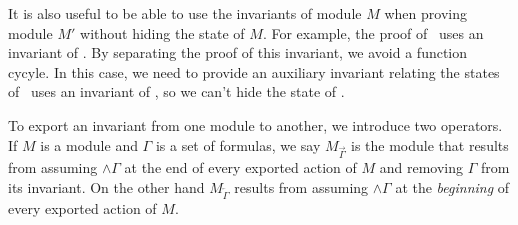 



It is also useful to be able to use the invariants of module $M$ when
proving module $M'$ without hiding the state of $M$. For example, the
proof of \mtoysystem\ uses an invariant of \mtoyprotocol. By separating
the proof of this invariant, we avoid a function cycyle. In this case,
we need to provide an auxiliary invariant relating the states of
\mtoysystem\ uses an invariant of \mtoyprotocol, so we can't hide the
state of \mtoyprotocol. 

To export an invariant from one module to another, we introduce two
operators.  If $M$ is a module and $\Gamma$ is a set of formulas, we
say $M_{\overrightarrow{\Gamma}}$ is the module that results from
assuming $\wedge \Gamma$ at the end of every exported action of $M$
and removing $\Gamma$ from its invariant. On the other hand
$M_{\overleftarrow{\Gamma}}$ results from assuming $\wedge \Gamma$ at
the \emph{beginning} of every exported action of $M$.

